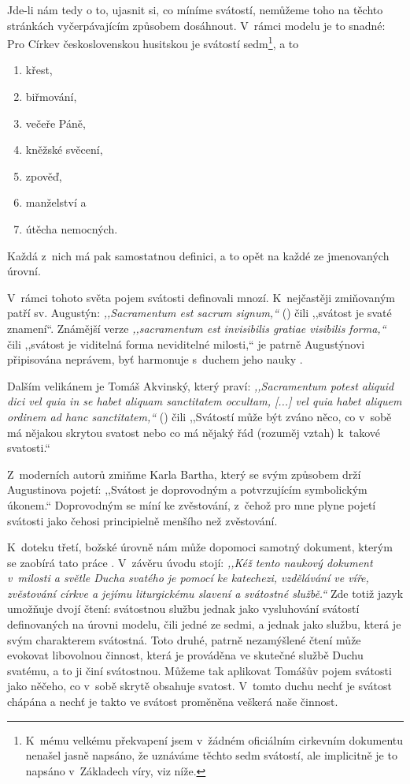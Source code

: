 Jde-li nám tedy o to, ujasnit si, co míníme svátostí, nemůžeme toho na těchto
stránkách vyčerpávajícím způsobem dosáhnout. V~rámci modelu je to snadné: Pro
Církev československou husitskou je svátostí sedm\footnote{K~mému velkému
překvapení jsem v~žádném oficiálním cirkevním dokumentu nenašel jasně napsáno,
že uznáváme těchto sedm svátostí, ale implicitně je to napsáno v~Základech víry,
viz níže.}, a to
\begin{enumerate}
\item{křest,}
\item{biřmování,}
\item{večeře Páně,}
\item{kněžské svěcení,}
\item{zpověď,}
\item{manželství a}
\item{útěcha nemocných.}
\end{enumerate}
Každá z~nich má pak samostatnou definici, a to opět na každé ze jmenovaných
úrovní.

V~rámci tohoto světa pojem svátosti definovali mnozí. K~nejčastěji zmiňovaným
patří sv. Augustýn: \textit{,,Sacramentum est sacrum signum,``}
(\citeauthor[De civitate Dei, X, 5]{augustinus426civitate}) čili ,,svátost je svaté znamení``. Známější verze
\textit{,,sacramentum est invisibilis gratiae visibilis forma,``} čili ,,svátost
je viditelná forma neviditelné milosti,`` je patrně Augustýnovi připisována
neprávem, byť harmonuje s~duchem jeho nauky \citep{king1967origin}.

Dalším velikánem je Tomáš Akvinský, který praví: \textit{,,Sacramentum potest
ali\-quid dici vel quia in se habet aliquam sanctitatem occultam, [...] vel quia
habet aliquem ordinem ad hanc sanctitatem,``} (\citeauthor[Summa Theologiae III Q60]{thomas1485summa}) čili
,,Svátostí může být zváno něco, co v~sobě má nějakou skrytou svatost nebo co má
nějaký řád (rozuměj vztah) k~takové svatosti.``

Z~moderních autorů zmiňme Karla Bartha, který se svým způsobem drží Augustinova
pojetí: ,,Svátost je doprovodným a potvrzujícím symbolickým úkonem.``
\citep[I, 1]{barth1946kirchliche} Doprovodným se míní ke zvěstování, z~čehož pro
mne plyne pojetí svátosti jako čehosi principielně menšího než zvěstování.

K~doteku třetí, božské úrovně nám může dopomoci samotný dokument, kterým se
zaobírá tato práce \citep{ccsh2014zaklady}. V~závěru úvodu stojí: \textit{,,Kéž tento naukový dokument
v~milosti a světle Ducha svatého je pomocí ke katechezi, vzdělávání ve víře,
zvěstování církve a jejímu liturgickému slavení a svátostné službě.``} Zde totiž
jazyk umožňuje dvojí čtení: svátostnou službu jednak jako vysluhování svátostí
definovaných na úrovni modelu, čili jedné ze sedmi, a jednak jako službu, která
je svým charakterem svátostná. Toto druhé, patrně nezamýšlené čtení může
evokovat libovolnou činnost, která je prováděna ve skutečné službě Duchu
svatému, a to ji činí svátostnou. Můžeme tak aplikovat Tomášův pojem svátosti
jako něčeho, co v~sobě skrytě obsahuje svatost. V~tomto duchu nechť je svátost
chápána a nechť je takto ve svátost proměněna veškerá naše činnost.

